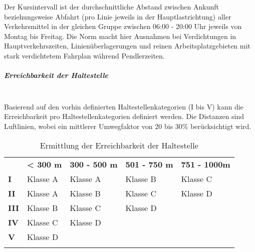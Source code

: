 Der Kursintervall ist der durchschnittliche Abstand zwischen Ankunft beziehungsweise Abfahrt (pro Linie jeweils in der Hauptlastrichtung) aller Verkehrsmittel in der gleichen Gruppe zwischen 06:00 - 20:00 Uhr jeweils von Montag bis Freitag.
Die Norm macht hier Ausnahmen bei Verdichtungen in Hauptverkehrszeiten, Linienüberlagerungen und reinen Arbeitsplatzgebieten mit stark verdichtetem Fahrplan während Pendlerzeiten.

\subparagraph{Erreichbarkeit der Haltestelle}~\\
\label{Definition ÖV-Güteklassen:Erreichbarkeit der Haltestelle}
Basierend auf den vorhin definierten Haltestellenkategorien (I bis V) kann die Erreichbarkeit pro Haltestellenkategorien definiert werden.
Die Distanzen sind Luftlinien, wobei ein mittlerer Umwegfaktor von 20 bis 30\% berücksichtigt wird.

\begin{longtable}[c]{l p{3.3cm} p{3.3cm} p{3.3cm} p{3.3cm}}
        \midrule
        \textbf{}
                                & \textbf{< 300 m}
                                & \textbf{300 - 500 m}
                                & \textbf{501 - 750 m}
                                & \textbf{751 - 1000m}\\
        \textbf{I}
                                & Klasse A
                                & Klasse A
                                & Klasse B
                                & Klasse C\\
        \textbf{II}
                                & Klasse A
                                & Klasse B
                                & Klasse C
                                & Klasse D\\
        \textbf{III}
                                & Klasse B
                                & Klasse C
                                & Klasse D
                                &\\
        \textbf{IV}
                                & Klasse C
                                & Klasse D
                                &
                                &\\
        \textbf{V}
                                & Klasse D
                                &
                                &
                                &\\
        \bottomrule
    \caption{Ermittlung der Erreichbarkeit der Haltestelle}
    \label{table:Ermittlung Erreichbarkeit der Haltestelle}
\end{longtable}


